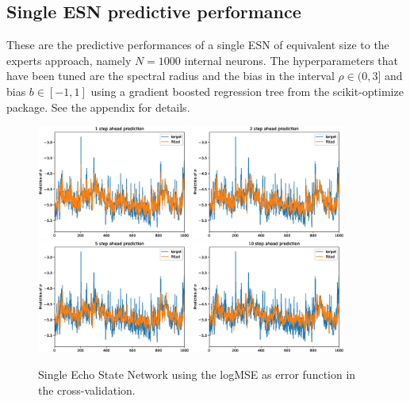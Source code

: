 \subsection{Single ESN predictive performance}

These are the predictive performances of a single ESN of equivalent size to the experts approach, namely $N=1000$ internal neurons. The hyperparameters that have been tuned are the spectral radius and the bias in the interval $\rho \in (0, 3]$ and bias $b \in [-1,1]$ using a gradient boosted regression tree from the scikit-optimize package. See the appendix for details.

\begin{figure}[H]
    \begin{center}
        \includegraphics[width=0.45\textwidth]{Plots/Prediction/Single_logMSE_1step.eps}
        \includegraphics[width=0.45\textwidth]{Plots/Prediction/Single_logMSE_2step.eps} \\
        \includegraphics[width=0.45\textwidth]{Plots/Prediction/Single_logMSE_5step.eps}
        \includegraphics[width=0.45\textwidth]{Plots/Prediction/Single_logMSE_10step.eps}
    \end{center}
    \caption{Single Echo State Network using the logMSE as error function in the cross-validation.}
    \label{FIG:SingleESNlogMSE}
\end{figure}


